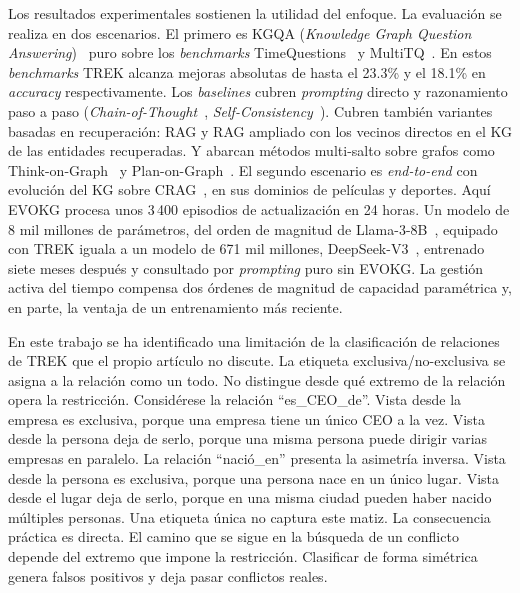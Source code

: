 Los resultados experimentales sostienen la utilidad del enfoque. La evaluación se realiza en dos escenarios. El primero es KGQA (\emph{Knowledge Graph Question Answering})~\cite{lan2022complex} puro sobre los \emph{benchmarks} TimeQuestions~\cite{jia2021timeq} y MultiTQ~\cite{chen2023multitq}. En estos \emph{benchmarks} TREK alcanza mejoras absolutas de hasta el 23.3\% y el 18.1\% en \emph{accuracy} respectivamente. Los \emph{baselines} cubren \emph{prompting} directo y razonamiento paso a paso (\emph{Chain-of-Thought}~\cite{wei2022cot}, \emph{Self-Consistency}~\cite{wang2023selfconsistency}). Cubren también variantes basadas en recuperación: RAG y RAG ampliado con los vecinos directos en el KG de las entidades recuperadas. Y abarcan métodos multi-salto sobre grafos como Think-on-Graph~\cite{sun2024tog} y Plan-on-Graph~\cite{luo2024pog}. El segundo escenario es \emph{end-to-end} con evolución del KG sobre CRAG~\cite{crag2024}, en sus dominios de películas y deportes. Aquí EVOKG procesa unos 3\,400 episodios de actualización en 24 horas. Un modelo de 8 mil millones de parámetros, del orden de magnitud de Llama-3-8B~\cite{llama3_2024}, equipado con TREK iguala a un modelo de 671 mil millones, DeepSeek-V3~\cite{deepseekv3_2025}, entrenado siete meses después y consultado por \emph{prompting} puro sin EVOKG. La gestión activa del tiempo compensa dos órdenes de magnitud de capacidad paramétrica y, en parte, la ventaja de un entrenamiento más reciente.

En este trabajo se ha identificado una limitación de la clasificación de relaciones de TREK que el propio artículo no discute. La etiqueta exclusiva/no-exclusiva se asigna a la relación como un todo. No distingue desde qué extremo de la relación opera la restricción. Considérese la relación ``es\_CEO\_de''. Vista desde la empresa es exclusiva, porque una empresa tiene un único CEO a la vez. Vista desde la persona deja de serlo, porque una misma persona puede dirigir varias empresas en paralelo. La relación ``nació\_en'' presenta la asimetría inversa. Vista desde la persona es exclusiva, porque una persona nace en un único lugar. Vista desde el lugar deja de serlo, porque en una misma ciudad pueden haber nacido múltiples personas. Una etiqueta única no captura este matiz. La consecuencia práctica es directa. El camino que se sigue en la búsqueda de un conflicto depende del extremo que impone la restricción. Clasificar de forma simétrica genera falsos positivos y deja pasar conflictos reales.

